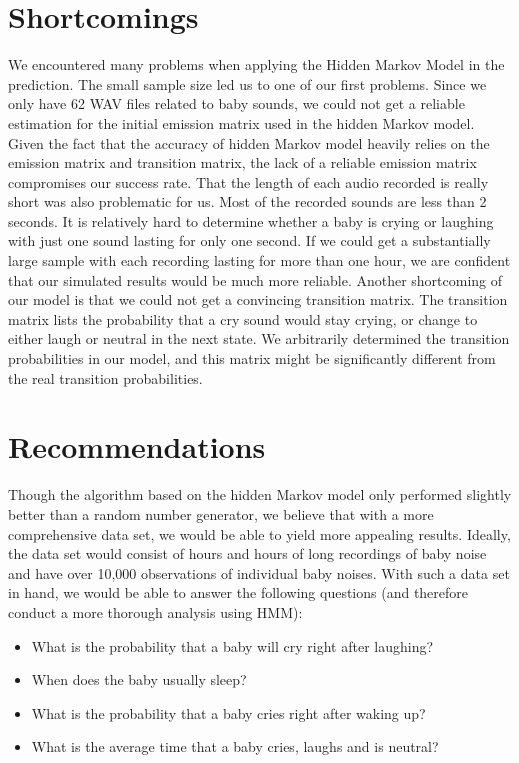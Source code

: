 \documentclass[paper=a4, fontsize=11pt]{scrartcl}
\numberwithin{equation}{section}
\numberwithin{figure}{section}
\numberwithin{table}{section}
\begin{document}
\section{Shortcomings}
We encountered many problems when applying the Hidden Markov Model in the prediction. The small sample size led us to one of our first problems. Since we only have 62 WAV files related to baby sounds, we could not get a reliable estimation for the initial emission matrix used in the hidden Markov model. Given the fact that the accuracy of hidden Markov model heavily relies on the emission matrix and transition matrix, the lack of a reliable emission matrix compromises our success rate. That the length of each audio recorded is really short was also problematic for us. Most of the recorded sounds are less than 2 seconds. It is relatively hard to determine whether a baby is crying or laughing with just one sound lasting for only one second. If we could get a substantially large sample with each recording lasting for more than one hour, we are confident that our simulated results would be much more reliable. Another shortcoming of our model is that we could not get a convincing transition matrix. The transition matrix lists the probability that a cry sound would stay crying, or change to either laugh or neutral in the next state. We arbitrarily determined the transition probabilities in our model, and this matrix might be significantly different from the real transition probabilities.

\section{Recommendations}
Though the algorithm based on the hidden Markov model only performed slightly better than a random number generator, we believe that with a more comprehensive data set, we would be able to yield more appealing results. Ideally, the data set would consist of hours and hours of long recordings of baby noise and have over 10,000 observations of individual baby noises. With such a data set in hand, we would be able to answer the following questions (and therefore conduct a more thorough analysis using HMM):

\begin{itemize}
	\item What is the probability that a baby will cry right after laughing?
    \item When does the baby usually sleep?
    \item What is the probability that a baby cries right after waking up?
    \item What is the average time that a baby cries, laughs and is neutral? 
\end{itemize}
\end{document}
